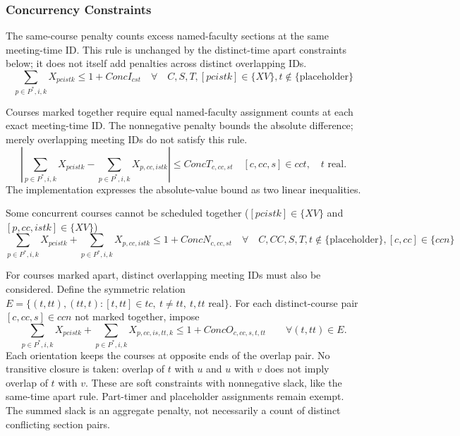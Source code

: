 \documentclass[11pt, oneside]{article}   	%
\begin{document}
\subsubsection{Concurrency Constraints}
The same-course penalty counts excess named-faculty sections at the same
meeting-time ID. This rule is unchanged by the distinct-time apart constraints
below; it does not itself add penalties across distinct overlapping IDs.
\begin{equation}
	\sum_{p \in P^{*},i,k} X_{pcistk} 
	\le 1 + ConcI_{cst} \quad \forall \quad C,S,T, 
	[pcistk] \in \{ XV \}, t \not \in \{\text{placeholder}\}
\end{equation}

Courses marked together require equal named-faculty assignment counts at each
exact meeting-time ID. The nonnegative penalty bounds the absolute difference;
merely overlapping meeting IDs do not satisfy this rule.
\begin{equation}
	\left|\sum_{p \in P^{*},i,k} X_{pcistk}
	- \sum_{p \in P^{*},i,k} X_{p,cc,istk}\right|
	\le ConcT_{c,cc,st}
	\quad [c,cc,s]\in cct,\quad t\text{ real}.
\end{equation}
The implementation expresses the absolute-value bound as two linear inequalities.

Some concurrent courses cannot be scheduled together ($[pcistk] \in \{ XV \}$ and $[p,cc,istk] \in \{ XV \}$)
\begin{equation}
	\sum_{p \in P^{*},i,k} X_{pcistk} 
	+ \sum_{p \in P^{*},i,k} X_{p,cc,istk} 
	\le 1  + ConcN_{c,cc,st} \quad \forall \quad C,CC,S,T, 
	t \not \in \{\text{placeholder}\}, [c,cc] \in \{ ccn \}
\end{equation}

For courses marked apart, distinct overlapping meeting IDs must also be
considered. Define the symmetric relation
$E=\{(t,tt),(tt,t):[t,tt]\in tc,\ t\ne tt,\ t,tt\text{ real}\}$.
For each distinct-course pair $[c,cc,s]\in ccn$ not marked together, impose
\begin{equation}
	\sum_{p\in P^{*},i,k}X_{pcistk}
	+\sum_{p\in P^{*},i,k}X_{p,cc,is,tt,k}
	\le 1+ConcO_{c,cc,s,t,tt}\qquad \forall(t,tt)\in E.
\end{equation}
Each orientation keeps the courses at opposite ends of the overlap pair.
No transitive closure is taken: overlap of $t$ with $u$ and $u$ with $v$ does
not imply overlap of $t$ with $v$. These are soft constraints with nonnegative
slack, like the same-time apart rule. Part-timer and placeholder assignments
remain exempt. The summed slack is an aggregate penalty, not necessarily a
count of distinct conflicting section pairs.
\end{document}
